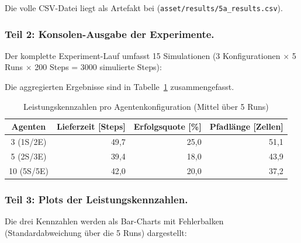 Die volle CSV-Datei liegt als Artefakt bei (\texttt{asset/results/5a\_results.csv}).

\subsubsection{Teil 2: Konsolen-Ausgabe der Experimente.}
Der komplette Experiment-Lauf umfasst 15 Simulationen (3 Konfigurationen \(\times\) 5 Runs \(\times\) 200 Steps = 3000 simulierte Steps):



Die aggregierten Ergebnisse sind in Tabelle~\ref{tab:performance_5a} zusammengefasst.

\begin{table}[H]
    \centering
    \begin{tabular}{c r r r}
        \toprule
        \textbf{Agenten} & \textbf{Lieferzeit [Steps]} & \textbf{Erfolgsquote [\%]} & \textbf{Pfadlänge [Zellen]} \\
        \midrule
        3 (1S/2E)   & 49{,}7 & 25{,}0 & 51{,}1 \\
        5 (2S/3E)   & 39{,}4 & 18{,}0 & 43{,}9 \\
        10 (5S/5E)  & 42{,}0 & 20{,}0 & 37{,}2 \\
        \bottomrule
    \end{tabular}
    \caption{Leistungskennzahlen pro Agentenkonfiguration (Mittel über 5 Runs)}
    \label{tab:performance_5a}
\end{table}

\subsubsection{Teil 3: Plots der Leistungskennzahlen.}
Die drei Kennzahlen werden als Bar-Charts mit Fehlerbalken (Standardabweichung über die 5 Runs) dargestellt:

